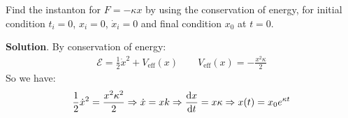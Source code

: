 \documentclass[../template.tex]{subfiles}
\begin{document}
\begin{exo}
    Find the instanton for $F = - \kappa x$ by using the conservation of energy, for initial condition $t_i = 0$, $x_i=0$, $\dot{x}_i = 0$ and final condition $x_0$ at $t=0$.

    \medskip

    \textbf{Solution}. By conservation of energy:
    \begin{align*}
        \mathcal{E}= \frac{1}{2} \dot{x}^2 + V_{\mathrm{eff} }(x) \qquad V_{\mathrm{eff}}(x) = -\frac{x^2 \kappa}{2} 
    \end{align*}
    So we have:
    \begin{align*}
        \frac{1}{2} \dot{x}^2 = \frac{x^2 \kappa^2}{2} \Rightarrow \dot{x} = xk \Rightarrow \dv{x}{t} = x \kappa \Rightarrow x(t) = x_0 e^{\kappa t}  
    \end{align*}
\end{exo}
\end{document}
